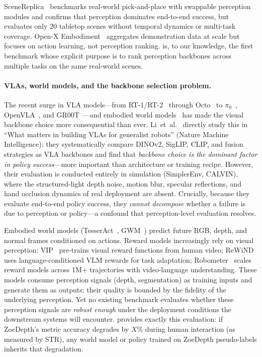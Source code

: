SceneReplica~\citep{scenereplica} benchmarks real-world pick-and-place with swappable perception modules and confirms that perception dominates end-to-end success, but evaluates only 20 tabletop scenes without temporal dynamics or multi-task coverage.
Open-X Embodiment~\citep{open_x_embodiment_rt_x_2023} aggregates demonstration data at scale but focuses on action learning, not perception ranking.
\coolname{} is, to our knowledge, the first benchmark whose explicit purpose is to rank perception backbones across multiple tasks on the same real-world scenes.

\paragraph{VLAs, world models, and the backbone selection problem.}
The recent surge in VLA models---from RT-1/RT-2~\citep{brohan2023rt2} through Octo~\citep{ghosh2024octo} to $\pi_0$~\citep{black2024pi0}, OpenVLA~\citep{kim2024openvla}, and GR00T~\citep{bjorck2025gr00t}---and embodied world models~\citep{zhen2025tesseract} has made the visual backbone choice more consequential than ever.
Li~et~al.~\citep{li2025robovlms} directly study this in ``What matters in building VLAs for generalist robots'' (Nature Machine Intelligence): they systematically compare DINOv2, SigLIP, CLIP, and fusion strategies as VLA backbones and find that \textit{backbone choice is the dominant factor in policy success}---more important than architecture or training recipe.
However, their evaluation is conducted entirely in simulation (SimplerEnv, CALVIN), where the structured-light depth noise, motion blur, specular reflections, and hand occlusion dynamics of real deployment are absent.
Crucially, because they evaluate end-to-end policy success, they \textit{cannot decompose} whether a failure is due to perception or policy---a confound that perception-level evaluation resolves.

Embodied world models (TesserAct~\citep{zhen2025tesseract}, GWM~\citep{lu2025gwm}) predict future RGB, depth, and normal frames conditioned on actions.
Reward models increasingly rely on visual perception: VIP~\citep{ma2023vip} pre-trains visual reward functions from human video; ReWiND~\citep{zhang2025rewind} uses language-conditioned VLM rewards for task adaptation; Robometer~\citep{liang2026robometer} scales reward models across 1M+ trajectories with video-language understanding.
These models consume perception signals (depth, segmentation) as training inputs and generate them as outputs; their quality is bounded by the fidelity of the underlying perception.
Yet no existing benchmark evaluates whether these perception signals are \textit{robust enough} under the deployment conditions the downstream systems will encounter.
\coolname{} provides exactly this evaluation: if ZoeDepth's metric accuracy degrades by $X$\% during human interaction (as measured by STR), any world model or policy trained on ZoeDepth pseudo-labels inherits that degradation.

